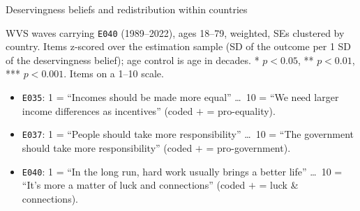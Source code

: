 \documentclass[aspectratio=169]{beamer}
\begin{document}
\begin{frame}{Deservingness beliefs and redistribution within countries}

\begin{table}
    \centering
    \caption*{Individual-level WVS: redistribution on deservingness belief (\texttt{E040})}
    \vspace{-0.4em}
    {\fontsize{7.5}{8.5}\selectfont\setlength{\tabcolsep}{5pt}}
\end{table}
\vspace{-0.6em}
\begin{center}
{\tiny
WVS waves carrying \texttt{E040} (1989--2022), ages 18--79, weighted, SEs clustered by country. Items z-scored over the estimation sample (SD of the outcome per 1 SD of the deservingness belief); age control is age in decades. 
* $p<0.05$, ** $p<0.01$, *** $p<0.001$. Items on a 1--10 scale.
\begin{itemize}\setlength{\itemsep}{0pt}
    \item \texttt{E035}: 1 = ``Incomes should be made more equal'' \dots\ 10 = ``We need larger income differences as incentives'' (coded $+$ = pro-equality).
    \item \texttt{E037}: 1 = ``People should take more responsibility'' \dots\ 10 = ``The government should take more responsibility'' (coded $+$ = pro-government).
    \item \texttt{E040}: 1 = ``In the long run, hard work usually brings a better life'' \dots\ 10 = ``It's more a matter of luck and connections'' (coded $+$ = luck \& connections).
\end{itemize}
\par}
\end{center}

\end{frame}




    
\end{document}

